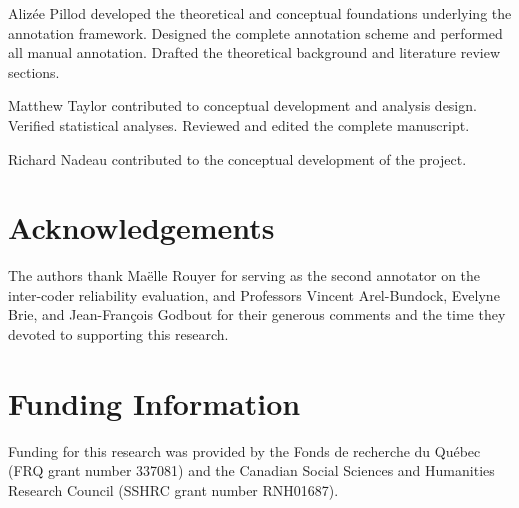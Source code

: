 \documentclass[12pt]{article}
\renewcommand\_{\texttt{\detokenize{_}\allowbreak}}
\begin{document}
Alizée Pillod developed the theoretical and conceptual foundations underlying the annotation framework. Designed the complete annotation scheme and performed all manual annotation. Drafted the theoretical background and literature review sections.

Matthew Taylor contributed to conceptual development and analysis design. Verified statistical analyses. Reviewed and edited the complete manuscript.

Richard Nadeau contributed to the conceptual development of the project.

\section{Acknowledgements}

The authors thank Maëlle Rouyer for serving as the second annotator on the inter-coder reliability evaluation, and Professors Vincent Arel-Bundock, Evelyne Brie, and Jean-François Godbout for their generous comments and the time they devoted to supporting this research.

\section{Funding Information}

Funding for this research was provided by the Fonds de recherche du Québec (FRQ grant number 337081) and the Canadian Social Sciences and Humanities Research Council (SSHRC grant number RNH01687).

\newpage
\printbibliography[title={References}]
\end{document}
